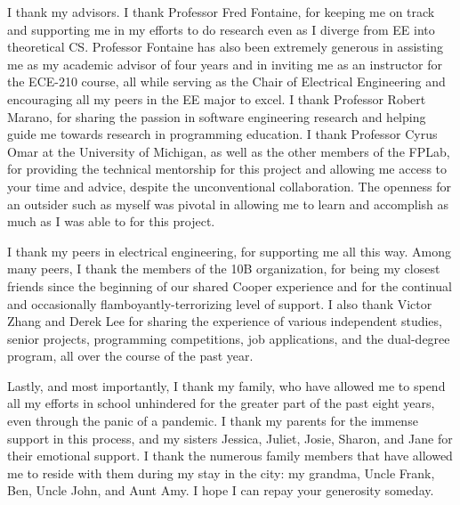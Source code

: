 
\noindent{}I thank my advisors. I thank Professor Fred Fontaine, for keeping me on track and supporting me in my efforts to do research even as I diverge from EE into theoretical CS. Professor Fontaine has also been extremely generous in assisting me as my academic advisor of four years and in inviting me as an instructor for the ECE-210 course, all while serving as the Chair of Electrical Engineering and encouraging all my peers in the EE major to excel. I thank Professor Robert Marano, for sharing the passion in software engineering research and helping guide me towards research in programming education. I thank Professor Cyrus Omar at the University of Michigan, as well as the other members of the FPLab, for providing the technical mentorship for this project and allowing me access to your time and advice, despite the unconventional collaboration. The openness for an outsider such as myself was pivotal in allowing me to learn and accomplish as much as I was able to for this project.

I thank my peers in electrical engineering, for supporting me all this way. Among many peers, I thank the members of the 10B organization, for being my closest friends since the beginning of our shared Cooper experience and for the continual and occasionally flamboyantly-terrorizing level of support. I also thank Victor Zhang and Derek Lee for sharing the experience of various independent studies, senior projects, programming competitions, job applications, and the dual-degree program, all over the course of the past year.

Lastly, and most importantly, I thank my family, who have allowed me to spend all my efforts in school unhindered for the greater part of the past eight years, even through the panic of a pandemic. I thank my parents for the immense support in this process, and my sisters Jessica, Juliet, Josie, Sharon, and Jane for their emotional support. I thank the numerous family members that have allowed me to reside with them during my stay in the city: my grandma, Uncle Frank, Ben, Uncle John, and Aunt Amy. I hope I can repay your generosity someday.

